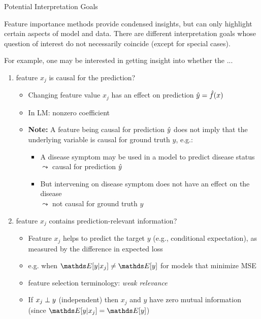 \begin{vbframe}{Potential Interpretation Goals}

Feature importance methods provide condensed insights, but can only highlight certain aspects of model and data. There are different interpretation goals whose question of interest do not necessarily coincide (except for special cases).

\lz

For example, one may be interested in getting insight into whether the ...

\begin{enumerate}
    \item<1|only@1> feature $x_j$ is causal for the prediction?
    \begin{itemize}
      \item Changing feature value $x_j$ has an effect on prediction $\yh = \fh(x)$
      \item In LM: nonzero coefficient
      \item \textbf{Note:} 
      A feature being causal for prediction $\yh$ does not imply that the underlying variable is causal for ground truth $y$, e.g.:
      \begin{itemize}
          \item A disease symptom may be used in a model to predict disease status \\
          $\leadsto$ causal for prediction $\yh$
          \item But intervening on disease symptom does not have an effect on the disease \\
          $\leadsto$ not causal for ground truth $y$
      \end{itemize}
    \end{itemize}
    \item<2|only@2> feature $x_j$ contains prediction-relevant information?
    \begin{itemize}
      \item Feature $x_j$ helps to predict the target $y$ (e.g., conditional expectation), as measured by the difference in expected loss
      \item e.g. when $\E[y|x_j] \neq \E[y]$ for models that minimize MSE
      \item feature selection terminology: \textit{weak relevance} 
      \item If $x_j \indep y$ (independent) then $x_j$ and $y$ have zero mutual information (since $\E[y|x_j] = \E[y]$)\\ %

\end{itemize}
\end{enumerate}
\end{vbframe}
